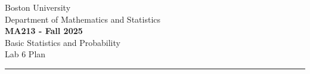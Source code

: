 \documentclass[12pt]{article}
\begin{document}
	
	
	
	\begin{center}		
        Boston University \\
        Department of Mathematics and Statistics \\ 
		\Large{\textbf{MA213 - Fall 2025}} \\ 
        \large{Basic Statistics and Probability} \\
        \large{Lab 6 Plan} \\ 
		\noindent\rule{16cm}{2pt}
	\end{center}
	
\end{document}
